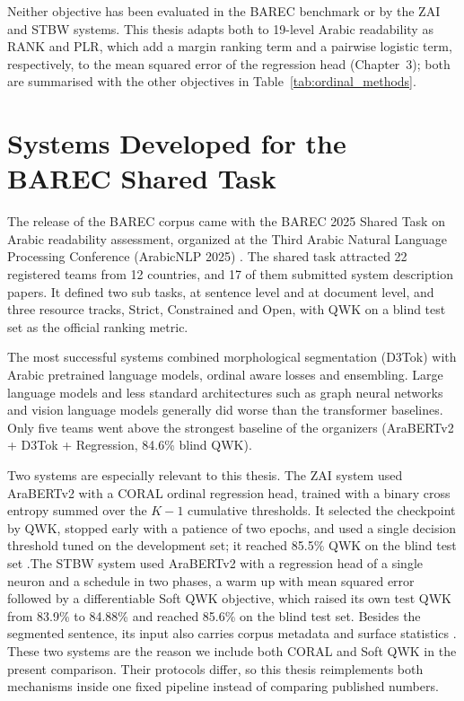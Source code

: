 \documentclass[12pt]{report}
\begin{document}
Neither objective has been evaluated in the BAREC benchmark or by the ZAI and STBW systems. This thesis adapts both to 19-level Arabic readability as RANK and PLR, which add a margin ranking term and a pairwise logistic term, respectively, to the mean squared error of the regression head (Chapter~3); both are summarised with the other objectives in Table~\ref{tab:ordinal_methods}.

\section{Systems Developed for the BAREC Shared Task}

The release of the BAREC corpus came with the BAREC 2025 Shared Task on Arabic readability assessment, organized at the Third Arabic Natural Language Processing Conference (ArabicNLP 2025) \cite{elmadani2025sharedtask}. The shared task attracted 22 registered teams from 12 countries, and 17 of them submitted system description papers. It defined two sub tasks, at sentence level and at document level, and three resource tracks, Strict, Constrained and Open, with QWK on a blind test set as the official ranking metric.

The most successful systems combined morphological segmentation (D3Tok) with Arabic pretrained language models, ordinal aware losses and ensembling. Large language models and less standard architectures such as graph neural networks and vision language models generally did worse than the transformer baselines. Only five teams went above the strongest baseline of the organizers (AraBERTv2 + D3Tok + Regression, 84.6\% blind QWK).

Two systems are especially relevant to this thesis. The ZAI system used AraBERTv2 with a CORAL ordinal regression head, trained with a binary cross entropy summed over the $K{-}1$ cumulative thresholds. It selected the checkpoint by QWK, stopped early with a patience of two epochs, and used a single decision threshold tuned on the development set; it reached 85.5\% QWK on the blind test set \cite{nazzal2025zai}.The STBW system used AraBERTv2 with a regression head of a single neuron and a schedule in two phases, a warm up with mean squared error followed by a differentiable Soft QWK objective, which raised its own test QWK from 83.9\% to 84.88\% and reached 85.6\% on the blind test set. Besides the segmented sentence, its input also carries corpus metadata and surface statistics \cite{trigui2025stbw}. These two systems are the reason we include both CORAL and Soft QWK in the present comparison. Their protocols differ, so this thesis reimplements both mechanisms inside one fixed pipeline instead of comparing published numbers.
\end{document}
